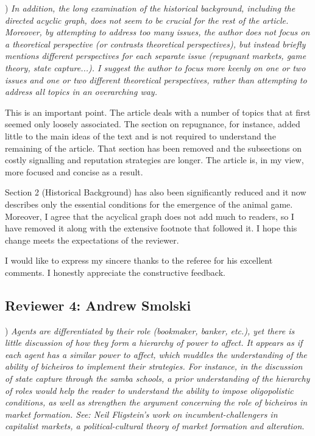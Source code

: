 \documentclass[a4paper,12pt]{article}
\begin{document}
\vspace{.5cm}

) \textit{In addition, the long examination of the historical background, including the directed acyclic graph, does not seem to be crucial for the rest of the article. Moreover, by attempting to address too many issues, the author does not focus on a theoretical perspective (or contrasts theoretical perspectives), but instead briefly mentions different perspectives for each separate issue (repugnant markets, game theory, state capture...). I suggest the author to focus more keenly on one or two issues and one or two different theoretical perspectives, rather than attempting to address all topics in an overarching way.}

\vspace{.25cm}

This is an important point. The article deals with a number of topics that at first seemed only loosely associated. The section on repugnance, for instance, added little to the main ideas of the text and is not required to understand the remaining of the article. That section has been removed and the subsections on costly signalling and reputation strategies are longer. The article is, in my view, more focused and concise as a result.

Section 2 (Historical Background) has also been significantly reduced and it now describes only the essential conditions for the emergence of the animal game. Moreover, I agree that the acyclical graph does not add much to readers, so I have removed it along with the extensive footnote that followed it. I hope this change meets the expectations of the reviewer.  

\vspace{.5cm}

I would like to express my sincere thanks to the referee for his excellent comments. I honestly appreciate the constructive feedback.

\newpage

\subsection*{Reviewer 4: Andrew Smolski}%
\label{sub:reviewer_4_andrew_smolski}

) \textit{Agents are differentiated by their role (bookmaker, banker, etc.), yet there is little discussion of how they form a hierarchy of power to affect. It appears as if each agent has a similar power to affect, which muddles the understanding of the ability of bicheiros to implement their strategies. For instance, in the discussion of state capture through the samba schools, a prior understanding of the hierarchy of roles would help the reader to understand the ability to impose oligopolistic conditions, as well as strengthen the argument concerning the role of bicheiros in market formation. See: Neil Fligstein's work on incumbent-challengers in capitalist markets, a political-cultural theory of market formation and alteration}. 
\end{document}
